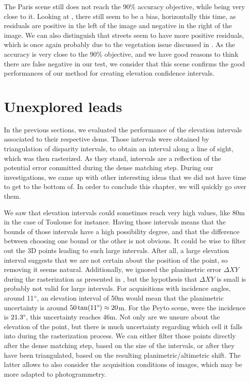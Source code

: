 The Paris scene still does not reach the $90\%$ accuracy objective, while being very close to it. Looking at , there still seem to be a bias, horizontally this time, as residuals are positive in the left of the image and negative in the right of the image. We can also distinguish that streets seem to have more positive residuals, which is once again probably due to the vegetation issue discussed in . As the accuracy is very close to the $90\%$ objective, and we have good reasons to think there are false negative in our test, we consider that this scene confirms the good performances of our method for creating elevation confidence intervals. 

\section{Unexplored leads}\label{sec:unexplored_leads}
In the previous sections, we evaluated the performance of the elevation intervals associated to their respective \acrshort{dsm}s. Those intervals were obtained by triangulation of disparity intervals, to obtain an interval along a line of sight, which was then rasterized. As they stand, intervals are a reflection of the potential error committed during the dense matching step. During our investigations, we came up with other interesting ideas that we did not have time to get to the bottom of. In order to conclude this chapter, we will quickly go over them.

We saw  that elevation intervals could sometimes reach very high values, like $80$m in the case of Toulouse for instance. Having those intervals means that the bounds of those intervals have a high possibility degree, and that the difference between choosing one bound or the other is not obvious. It could be wise to filter out the 3D points leading to such large intervals. After all, a large elevation interval suggests that we are not certain about the position of the point, so removing it seems natural. Additionally, we ignored the planimetric error $\Delta XY$ during the rasterization as presented in , but the hypothesis that $\Delta XY$ is small is probably not valid for large intervals. For acquisitions with incidence angles, around 11$\degree$, an elevation interval of 50m would mean that the planimetric uncertainty is around $50\tan(11\degree)\approx20$m. For the Peyto scene, were the incidence is $21.3\degree$, this uncertainty reaches $46$m. Not only are we unsure about the elevation of the point, but there is much uncertainty regarding which cell it falls into during the rasterization process. We can either filter those points directly after the dense matching step, based on the size of the intervals, or after they have been triangulated, based on the resulting planimetric/altimetric shift. The latter allows to also consider the acquisition conditions of images, which may be more adapted to photogrammetry.

